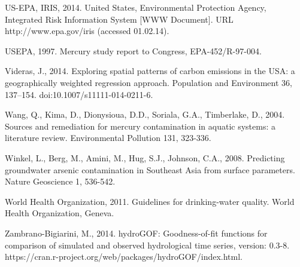 \begin{thebibliography}
\bibitem{} \hangindent=1cm US-EPA, IRIS, 2014. United States, Environmental Protection Agency, Integrated Risk Information System [WWW Document]. URL http://www.epa.gov/iris (accessed 01.02.14).

\bibitem{} \hangindent=1cm USEPA, 1997. Mercury study report to Congress, EPA-452/R-97-004.

\bibitem{} \hangindent=1cm Videras, J., 2014. Exploring spatial patterns of carbon emissions in the USA: a geographically weighted regression approach. Population and Environment 36, 137–154. doi:10.1007/s11111-014-0211-6.

\bibitem{} \hangindent=1cm Wang, Q., Kima, D., Dionysioua, D.D., Soriala, G.A., Timberlake, D., 2004. Sources and remediation for mercury contamination in aquatic systems: a literature review. Environmental Pollution 131, 323-336.

\bibitem{} \hangindent=1cm Winkel, L., Berg, M., Amini, M., Hug, S.J., Johnson, C.A., 2008. Predicting groundwater arsenic contamination in Southeast Asia from surface parameters. Nature Geoscience 1, 536-542.

\bibitem{} \hangindent=1cm World Health Organization, 2011. Guidelines for drinking-water quality. World Health Organization, Geneva.

\bibitem{} \hangindent=1cm Zambrano-Bigiarini, M., 2014. hydroGOF: Goodness-of-fit functions for comparison of simulated and observed hydrological time series, version: 0.3-8. https://cran.r-project.org/web/packages/hydroGOF/index.html.

\end{thebibliography}

\endgroup

